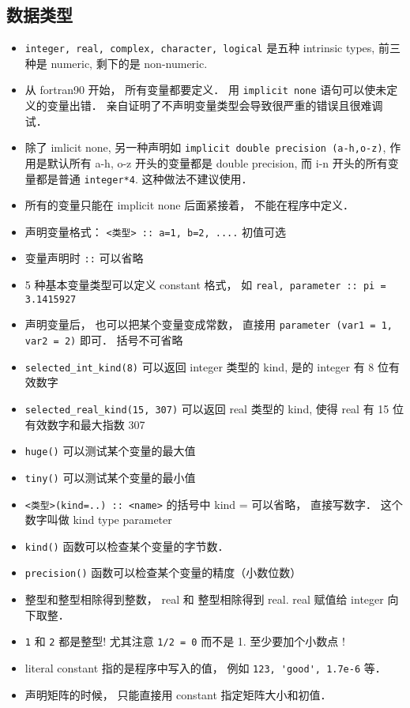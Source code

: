 \subsection{数据类型}
\begin{itemize}
\item \verb`integer, real, complex, character, logical` 是五种 intrinsic types, 前三种是 numeric, 剩下的是 non-numeric.
\item 从 fortran90 开始， 所有变量都要定义． 用 \verb|implicit none| 语句可以使未定义的变量出错． 亲自证明了不声明变量类型会导致很严重的错误且很难调试．
\item 除了 imlicit none, 另一种声明如 \verb|implicit double precision (a-h,o-z)|, 作用是默认所有 a-h, o-z 开头的变量都是 double precision, 而 i-n 开头的所有变量都是普通 \verb|integer*4|. 这种做法不建议使用．
\item 所有的变量只能在 implicit none 后面紧接着， 不能在程序中定义．
\item 声明变量格式：  \verb`<类型> :: a=1, b=2, ....`  初值可选
\item 变量声明时 \verb`::` 可以省略
\item 5 种基本变量类型可以定义 constant 格式， 如  \verb`real, parameter :: pi = 3.1415927`
\item 声明变量后， 也可以把某个变量变成常数， 直接用 \verb|parameter (var1 = 1, var2 = 2)| 即可． 括号不可省略
\item \verb`selected_int_kind(8)` 可以返回 integer 类型的 kind, 是的 integer 有 8 位有效数字
\item \verb`selected_real_kind(15, 307)` 可以返回 real 类型的 kind, 使得 real 有 15 位有效数字和最大指数 307
\item \verb`huge()` 可以测试某个变量的最大值
\item \verb`tiny()` 可以测试某个变量的最小值
\item \verb`<类型>(kind=..) :: <name>` 的括号中 kind = 可以省略， 直接写数字． 这个数字叫做 kind type parameter
\item \verb`kind()` 函数可以检查某个变量的字节数．
\item \verb`precision()` 函数可以检查某个变量的精度（小数位数）
\item 整型和整型相除得到整数， real 和 整型相除得到 real. real 赋值给 integer 向下取整．
\item \verb`1` 和 \verb`2` 都是整型! 尤其注意 \verb`1/2 = 0` 而不是 1.   至少要加个小数点 !
\item literal constant 指的是程序中写入的值， 例如 \verb`123, 'good', 1.7e-6` 等．
\item 声明矩阵的时候， 只能直接用 constant 指定矩阵大小和初值．
\end{itemize}

